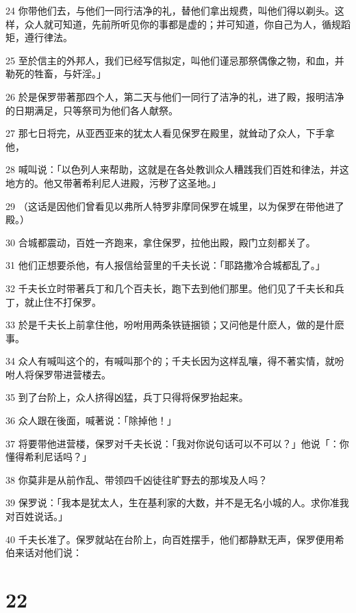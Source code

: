 \par 24 你带他们去，与他们一同行洁净的礼，替他们拿出规费，叫他们得以剃头。这样，众人就可知道，先前所听见你的事都是虚的；并可知道，你自己为人，循规蹈矩，遵行律法。
\par 25 至於信主的外邦人，我们已经写信拟定，叫他们谨忌那祭偶像之物，和血，并勒死的牲畜，与奸淫。」
\par 26 於是保罗带著那四个人，第二天与他们一同行了洁净的礼，进了殿，报明洁净的日期满足，只等祭司为他们各人献祭。
\par 27 那七日将完，从亚西亚来的犹太人看见保罗在殿里，就耸动了众人，下手拿他，
\par 28 喊叫说：「以色列人来帮助，这就是在各处教训众人糟践我们百姓和律法，并这地方的。他又带著希利尼人进殿，污秽了这圣地。」
\par 29 （这话是因他们曾看见以弗所人特罗非摩同保罗在城里，以为保罗在带他进了殿。）
\par 30 合城都震动，百姓一齐跑来，拿住保罗，拉他出殿，殿门立刻都关了。
\par 31 他们正想要杀他，有人报信给营里的千夫长说：「耶路撒冷合城都乱了。」
\par 32 千夫长立时带著兵丁和几个百夫长，跑下去到他们那里。他们见了千夫长和兵丁，就止住不打保罗。
\par 33 於是千夫长上前拿住他，吩咐用两条铁链捆锁；又问他是什麽人，做的是什麽事。
\par 34 众人有喊叫这个的，有喊叫那个的；千夫长因为这样乱嚷，得不著实情，就吩咐人将保罗带进营楼去。
\par 35 到了台阶上，众人挤得凶猛，兵丁只得将保罗抬起来。
\par 36 众人跟在後面，喊著说：「除掉他！」
\par 37 将要带他进营楼，保罗对千夫长说：「我对你说句话可以不可以？」他说「：你懂得希利尼话吗？」
\par 38 你莫非是从前作乱、带领四千凶徒往旷野去的那埃及人吗？
\par 39 保罗说：「我本是犹太人，生在基利家的大数，并不是无名小城的人。求你准我对百姓说话。」
\par 40 千夫长准了。保罗就站在台阶上，向百姓摆手，他们都静默无声，保罗便用希伯来话对他们说：

\chapter{22}


